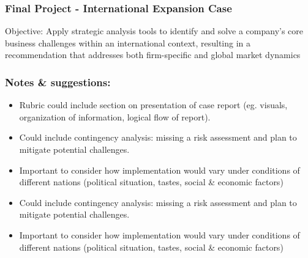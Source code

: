 \documentclass[
  11pt,
]{article}
\providecommand{\tightlist}{%
  \setlength{\itemsep}{0pt}\setlength{\parskip}{0pt}}
\begin{document}
\subsubsection{Final Project - International Expansion
Case}\label{final-project---international-expansion-case}

Objective: Apply strategic analysis tools to identify and solve a
company's core business challenges within an international context,
resulting in a recommendation that addresses both firm-specific and
global market dynamics

\subsubsection{Notes \& suggestions:}\label{notes-suggestions}

\begin{itemize}
\tightlist
\item
  Rubric could include section on presentation of case report (eg.
  visuals, organization of information, logical flow of report).
\item
  Could include contingency analysis: missing a risk assessment and plan
  to mitigate potential challenges.
\item
  Important to consider how implementation would vary under conditions
  of different nations (political situation, tastes, social \& economic
  factors)
\item
  Could include contingency analysis: missing a risk assessment and plan
  to mitigate potential challenges.
\item
  Important to consider how implementation would vary under conditions
  of different nations (political situation, tastes, social \& economic
  factors)
\end{itemize}


\printbibliography
\end{document}
